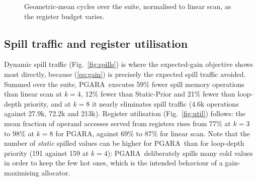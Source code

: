\documentclass[conference]{IEEEtran}
\newcommand{\MG}{PGARA}
\begin{document}
\begin{figure}[t]
\centering
{}
\caption{Geometric-mean cycles over the suite, normalised to linear
scan, as the register budget varies.}
\label{fig:ksweep}
\end{figure}

\subsection{Spill traffic and register utilisation}

Dynamic spill traffic (Fig.~\ref{fig:spills}) is where the
expected-gain objective shows most directly, because (\ref{eq:gain})
is precisely the expected spill traffic avoided. Summed over the suite,
\MG\ executes 59\% fewer spill memory operations than linear scan at
$k=4$, 12\% fewer than Static-Prior and 21\% fewer than loop-depth
priority, and at $k=8$ it nearly eliminates spill traffic (4.6k
operations against 27.9k, 72.2k and 213k). Register utilisation
(Fig.~\ref{fig:util}) follows: the mean fraction of operand accesses
served from registers rises from 77\% at $k=3$ to 98\% at $k=8$ for
\MG, against 69\% to 87\% for linear scan. Note that the number of
\emph{static} spilled values can be higher for \MG\ than for loop-depth
priority (191 against 159 at $k=4$): \MG\ deliberately spills many
cold values in order to keep the few hot ones, which is the intended
behaviour of a gain-maximising allocator.
\end{document}
